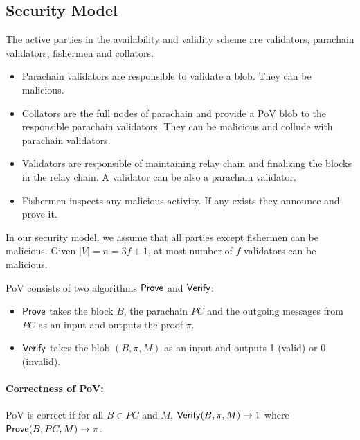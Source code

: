 \subsection{Security Model}



The active parties in the availability and validity scheme are validators, parachain validators, fishermen and collators. 




\begin{itemize}

\item Parachain validators are responsible to validate a blob. They can be malicious.
\item Collators are the full nodes of parachain and provide a PoV blob to the responsible parachain validators. They can be malicious and collude with parachain validators.
\item Validators are responsible of maintaining relay chain and finalizing the blocks in the relay chain. A validator can be also a parachain validator. 
\item Fishermen inspects any malicious activity. If any exists they announce and prove it.  



\end{itemize}

In our security model, we assume that all parties except fishermen can be malicious. Given $|V| = n = 3f + 1$, at most number of $f$ validators can be malicious.


\begin{definition}\label{def:pob}
PoV consists of two algorithms $\mathsf{Prove}$ and $\mathsf{Verify}$:
\begin{itemize}
    \item $\mathsf{Prove}$  takes the block $B$, the parachain $PC$ and the outgoing messages from $PC$ as an input and outputs the proof $\pi$.
    \item $\mathsf{Verify}$  takes the blob $(B,\pi,M)$ as an input and outputs 1 (valid) or 0 (invalid).
\end{itemize}
\end{definition}
\paragraph{Correctness of PoV:} PoV is correct if for all $B \in PC$ and $M$, $\mathsf{Verify}(B,\pi,M)\rightarrow 1$ where $\mathsf{Prove}(B, PC,M)\rightarrow \pi$.


